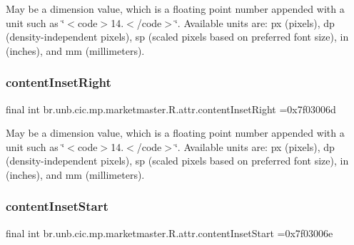 May be a dimension value, which is a floating point number appended with a unit such as \char`\"{}$<$code$>$14.\+5sp$<$/code$>$\char`\"{}. Available units are\+: px (pixels), dp (density-\/independent pixels), sp (scaled pixels based on preferred font size), in (inches), and mm (millimeters). \mbox{\label{classbr_1_1unb_1_1cic_1_1mp_1_1marketmaster_1_1R_1_1attr_a275d313968d68e579c9b9092d10fed35}} 
\subsubsection{\texorpdfstring{content\+Inset\+Right}{contentInsetRight}}
{\footnotesize\ttfamily final int br.\+unb.\+cic.\+mp.\+marketmaster.\+R.\+attr.\+content\+Inset\+Right =0x7f03006d\hspace{0.3cm}{\ttfamily [static]}}

May be a dimension value, which is a floating point number appended with a unit such as \char`\"{}$<$code$>$14.\+5sp$<$/code$>$\char`\"{}. Available units are\+: px (pixels), dp (density-\/independent pixels), sp (scaled pixels based on preferred font size), in (inches), and mm (millimeters). \mbox{\label{classbr_1_1unb_1_1cic_1_1mp_1_1marketmaster_1_1R_1_1attr_a23bea47ff36c0deea9362a081f46f50b}} 
\subsubsection{\texorpdfstring{content\+Inset\+Start}{contentInsetStart}}
{\footnotesize\ttfamily final int br.\+unb.\+cic.\+mp.\+marketmaster.\+R.\+attr.\+content\+Inset\+Start =0x7f03006e\hspace{0.3cm}{\ttfamily [static]}}

